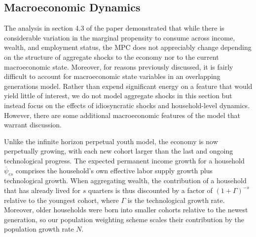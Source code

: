 \documentclass{econtex}\usepackage[pdftex]{graphicx}\usepackage{epstopdf} \usepackage[pdftex]{hyperref}
\newcommand{\pshk}{\psi} %
\begin{document}
\subsection{Macroeconomic Dynamics}

The analysis in section 4.3 of the paper demonstrated that while there is considerable variation in the marginal propensity to consume across income, wealth, and employment status, the MPC does not appreciably change depending on the structure of aggregate shocks to the economy nor to the current macroeconomic state.  Moreover, for reasons previously discussed, it is fairly difficult to account for macroeconomic state variables in an overlapping generations model.  Rather than expend significant energy on a feature that would yield little of interest, we do not model aggregate shocks in this section but instead focus on the effects of idiosyncratic shocks and household-level dynamics.  However, there are some additional macroeconomic features of the model that warrant discussion.

Unlike the infinite horizon perpetual youth model, the economy is now perpetually growing, with each new cohort larger than the last and ongoing technological progress.  The expected permanent income growth for a household $\overline{\pshk}_{es}$ comprises the household's own effective labor supply growth plus technological growth.  When aggregating wealth, the contribution of a household that has already lived for $s$ quarters is thus discounted by a factor of $(1 + \Gamma)^{-s}$ relative to the youngest cohort, where $\Gamma$ is the technological growth rate.  Moreover, older households were born into smaller cohorts relative to the newest generation, so our population weighting scheme scales their contribution by the population growth rate $N$.
\end{document}
